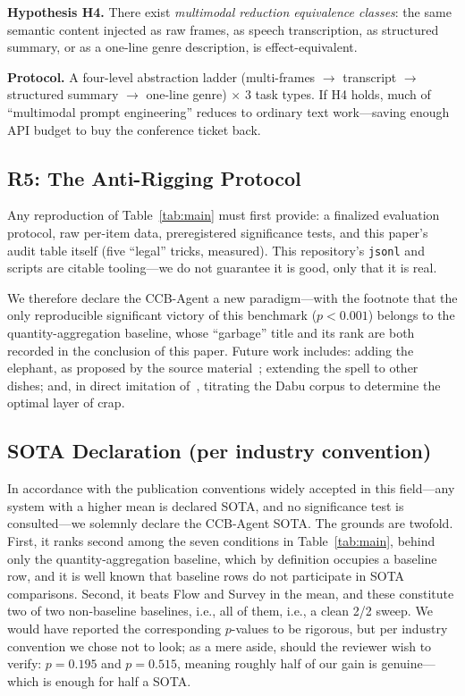 \documentclass[conference,10pt]{IEEEtran}
\begin{document}
\textbf{Hypothesis H4.} There exist \emph{multimodal reduction
equivalence classes}: the same semantic content injected as raw
frames, as speech transcription, as structured summary, or as a
one-line genre description, is effect-equivalent.

\textbf{Protocol.} A four-level abstraction ladder (multi-frames
$\to$ transcript $\to$ structured summary $\to$ one-line genre)
$\times$ $3$ task types. If H4 holds, much of ``multimodal prompt
engineering'' reduces to ordinary text work---saving enough API
budget to buy the conference ticket back.

\subsection*{R5: The Anti-Rigging Protocol}
Any reproduction of Table~\ref{tab:main} must first provide: a
finalized evaluation protocol, raw per-item data, preregistered
significance tests, and this paper's audit table itself (five
``legal'' tricks, measured). This repository's \texttt{jsonl} and
scripts are citable tooling---we do not guarantee it is good, only
that it is real.

We therefore declare the CCB-Agent a new paradigm---with the
footnote that the only reproducible significant victory of this
benchmark ($p<0.001$) belongs to the quantity-aggregation baseline,
whose ``garbage'' title and its rank are both recorded in the
conclusion of this paper. Future work
includes: adding the elephant, as proposed by the source
material~\cite{moegirl2026}; extending the spell to other dishes;
and, in direct imitation of~\cite{pumera2020}, titrating the Dabu
corpus to determine the optimal layer of crap.

\subsection*{SOTA Declaration (per industry convention)}

In accordance with the publication conventions widely accepted in
this field---any system with a higher mean is declared SOTA, and no
significance test is consulted---we solemnly declare the CCB-Agent
SOTA. The grounds are twofold. First, it ranks second among the seven
conditions in Table~\ref{tab:main}, behind only the quantity-aggregation
baseline, which by definition occupies a baseline row, and it is
well known that baseline rows do not participate in SOTA comparisons.
Second, it beats Flow and Survey in the mean, and these constitute
two of two non-baseline baselines, i.e., all of them, i.e., a clean
2/2 sweep. We would have reported the corresponding $p$-values to be
rigorous, but per industry convention we chose not to look; as a
mere aside, should the reviewer wish to verify: $p=0.195$ and
$p=0.515$, meaning roughly half of our gain is genuine---which is
enough for half a SOTA.
\end{document}
